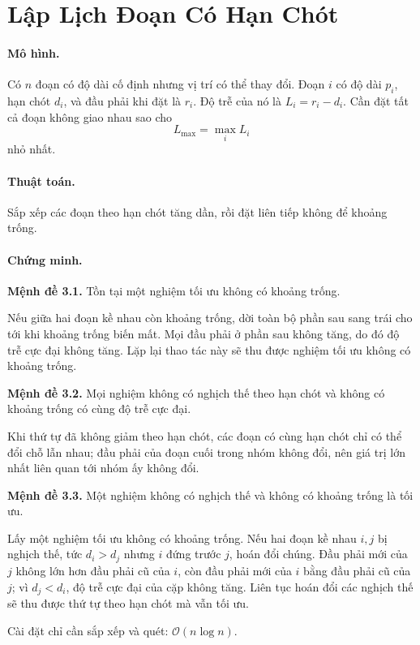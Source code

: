 \documentclass[11pt]{article}
\newcommand{\Oh}{\mathcal{O}}
\begin{document}
\section{Lập Lịch Đoạn Có Hạn Chót}

\paragraph{Mô hình.}
Có \(n\) đoạn có độ dài cố định nhưng vị trí có thể thay đổi. Đoạn \(i\) có độ
dài \(p_i\), hạn chót \(d_i\), và đầu phải khi đặt là \(r_i\). Độ trễ của nó
là \(L_i=r_i-d_i\). Cần đặt tất cả đoạn không giao nhau sao cho
\[
  L_{\max}=\max_i L_i
\]
nhỏ nhất.

\paragraph{Thuật toán.}
Sắp xếp các đoạn theo hạn chót tăng dần, rồi đặt liên tiếp không để khoảng
trống.

\paragraph{Chứng minh.}
\textbf{Mệnh đề 3.1.} Tồn tại một nghiệm tối ưu không có khoảng trống.

Nếu giữa hai đoạn kề nhau còn khoảng trống, dời toàn bộ phần sau sang trái
cho tới khi khoảng trống biến mất. Mọi đầu phải ở phần sau không tăng, do đó
độ trễ cực đại không tăng. Lặp lại thao tác này sẽ thu được nghiệm tối ưu không
có khoảng trống.

\textbf{Mệnh đề 3.2.} Mọi nghiệm không có nghịch thế theo hạn chót và không có
khoảng trống có cùng độ trễ cực đại.

Khi thứ tự đã không giảm theo hạn chót, các đoạn có cùng hạn chót chỉ có thể
đổi chỗ lẫn nhau; đầu phải của đoạn cuối trong nhóm không đổi, nên giá trị
lớn nhất liên quan tới nhóm ấy không đổi.

\textbf{Mệnh đề 3.3.} Một nghiệm không có nghịch thế và không có khoảng trống
là tối ưu.

Lấy một nghiệm tối ưu không có khoảng trống. Nếu hai đoạn kề nhau \(i,j\) bị
nghịch thế, tức \(d_i>d_j\) nhưng \(i\) đứng trước \(j\), hoán đổi chúng. Đầu
phải mới của \(j\) không lớn hơn đầu phải cũ của \(i\), còn đầu phải mới của
\(i\) bằng đầu phải cũ của \(j\); vì \(d_j<d_i\), độ trễ cực đại của cặp không
tăng. Liên tục hoán đổi các nghịch thế sẽ thu được thứ tự theo hạn chót mà vẫn
tối ưu.

Cài đặt chỉ cần sắp xếp và quét: \(\Oh(n\log n)\).
\end{document}
